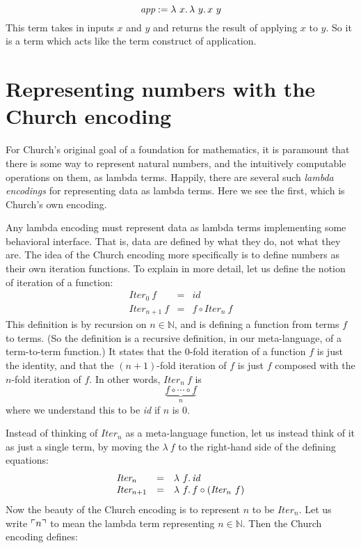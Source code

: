 \[
\textit{app} := \lam{x}{\lam{y}{x\ y}}
\]
\noindent This term takes in inputs $x$ and $y$ and returns the result of applying $x$ to $y$.  So it is a term which acts like the term construct of application.

\section{Representing numbers with the Church encoding}
\label{sec:churchenc}

For Church's original goal of a foundation for mathematics, it is
paramount that there is some way to represent natural numbers, and the
intuitively computable operations on them, as lambda terms.  Happily,
there are several such \emph{lambda encodings} for representing data
as lambda terms.  Here we see the first, which is Church's own encoding.

Any lambda encoding must represent data as lambda terms implementing
some behavioral interface.  That is, data are defined by what they do,
not what they are.  The idea of the Church encoding more specifically
is to define numbers as their own iteration functions.  To explain
in more detail, let us define the notion of iteration of a function:
\[
\begin{array}{lll}
  \textit{Iter}_0\ f & = & \textit{id} \\ 
  \textit{Iter}_{n+1}\ f & = & f \circ \textit{Iter}_n\ f
\end{array}
\]
\noindent This definition is by recursion on $n\in\mathbb{N}$, and is
defining a function from terms $f$ to terms.  (So the definition is a
recursive definition, in our meta-language, of a term-to-term
function.)  It states that the $0$-fold iteration of a function $f$ is
just the identity, and that the $(n+1)$-fold iteration of $f$ is just
$f$ composed with the $n$-fold iteration of $f$.  In other words,
$\textit{Iter}_n\ f$ is
\[
\underbrace{f \circ \cdots \circ f}_{n}
\]
\noindent where we understand this to be \textit{id} if $n$ is $0$.

Instead of thinking of $\textit{Iter}_n$ as a meta-language function,
let us instead think of it as just a single term, by moving the $\lambda\ f$ to
the right-hand side of the defining equations:
\[
\begin{array}{lll}
  \textit{Iter}_n & = & \lam{f}{\textit{id}} \\ 
  \textit{Iter}_{n+1} & = & \lam{f}{f \circ (\textit{Iter}_n\ f)}
\end{array}
\]
\noindent Now the beauty of the Church encoding is to represent $n$
to be $\textit{Iter}_n$.  Let us write $\ulcorner n \urcorner$ to mean the lambda
term representing $n\in\mathbb{N}$.  Then the Church encoding defines:

